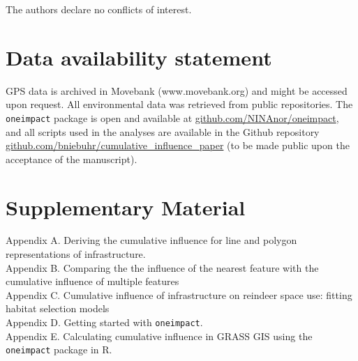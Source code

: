 \documentclass[titlepage]{article}
\begin{document}
The authors declare no conflicts of interest.

\section*{Data availability statement}

GPS data is archived in Movebank (www.movebank.org) and might be accessed upon request. All environmental data was retrieved from public repositories. The \verb|oneimpact| package is open and available at \url{github.com/NINAnor/oneimpact}, and all scripts used in the analyses are available in the Github repository \url{github.com/bniebuhr/cumulative_influence_paper} (to be made public upon the acceptance of the manuscript).

\section*{Supplementary Material}

Appendix A. Deriving the cumulative influence for line and polygon representations of infrastructure. \\
Appendix B. Comparing the the influence of the nearest feature with the cumulative influence of multiple features \\
Appendix C. Cumulative influence of infrastructure on reindeer space use: fitting habitat selection models \\
Appendix D. Getting started with \verb|oneimpact|. \\
Appendix E. Calculating cumulative influence in GRASS GIS using the \verb|oneimpact| package in R.



\end{document}
